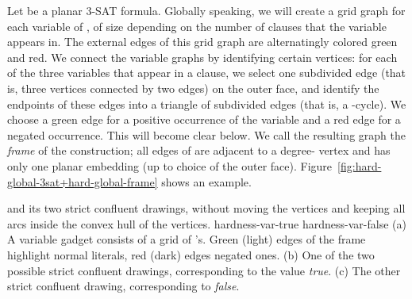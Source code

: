 \documentclass{llncs}
\begin{document}
Let  be a planar 3-SAT formula. Globally speaking, we will create a grid graph for each variable of , of size depending on the number of clauses that the variable appears in. The external edges of this grid graph are alternatingly colored green and red.
We connect the variable graphs by identifying certain vertices: for each of the three variables that appear in a clause, we select one subdivided edge (that is, three vertices connected by two edges) on the outer face, and identify the endpoints of these edges into a triangle of subdivided edges (that is, a -cycle). We choose a green edge for a positive occurrence of the variable and a red edge for a negated occurrence. This will become clear below.
We call the resulting graph  the \emph {frame} of the construction; all edges of  are adjacent to a degree- vertex and  has only one planar embedding (up to choice of the outer face).
Figure~\ref {fig:hard-global-3sat+hard-global-frame} shows an example.

 { and its two strict confluent drawings, without moving the vertices and keeping all arcs inside the convex hull of the vertices.}
 {hardness-var-true} {hardness-var-false}
{ (a) A variable gadget consists of a grid of 's. Green (light) edges of the frame highlight normal literals, red (dark) edges negated ones.
  (b) One of the two possible strict  confluent drawings, corresponding to the value \emph {true}.
  (c) The other strict confluent drawing, corresponding to \emph {false}.
}
\end{document}
